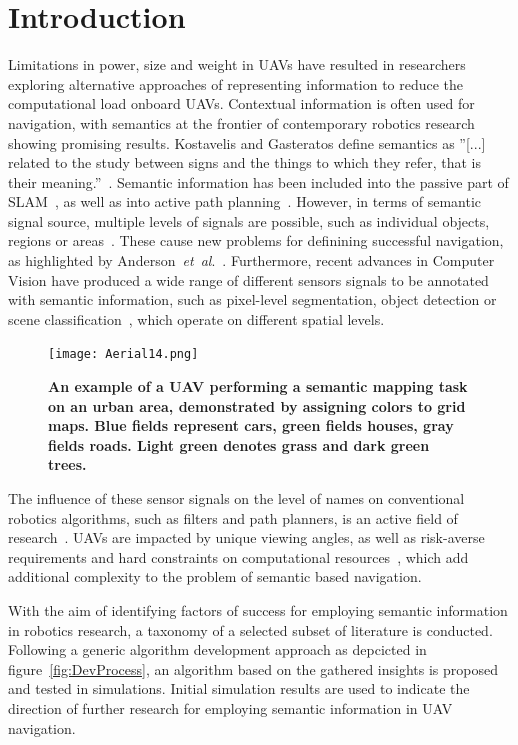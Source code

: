 \documentclass[twocolumn,letterpaper]{IEEEAerospaceCLS}  %
\newcommand{\abbreviation}[1]{\emph{#1}.}
\newcommand{\etal}{\abbreviation{et~al}}
\begin{document}
\section{Introduction} \label{sec:Intro}
Limitations in power, size and weight in UAVs have resulted in researchers exploring alternative approaches of representing information to reduce the computational load onboard UAVs. Contextual information is often used for navigation, with semantics at the frontier of contemporary robotics research showing promising results. Kostavelis and Gasteratos define semantics as ''[...] related to the study between signs and the things to which they refer, that is their meaning.''~\cite{kostavelis_semantic_2015}. Semantic information has been included into the passive part of SLAM~\cite{cadena_past_2016,zhang_hierarchical_2019}, as well as into active path planning~\cite{koch_automatic_2019,alirezaie_exploiting_2017}.  However, in terms of semantic signal source, multiple levels of signals are possible, such as individual objects, regions or areas~\cite{kostavelis_semantic_2015}. These cause new problems for definining successful navigation, as highlighted by Anderson~\etal~\cite{anderson_evaluation_2018}. Furthermore, recent advances in Computer Vision have produced a wide range of different sensors signals to be annotated with semantic information, such as pixel-level segmentation, object detection or scene classification~\cite{alom_history_2018}, which operate on different spatial levels.
\begin{figure}[t]
    \centering
    \texttt{[image: Aerial14.png]}\\
    \caption{\bf{An example of a UAV performing a semantic mapping task on an urban area, demonstrated by assigning colors to grid maps. Blue fields represent cars, green fields houses, gray fields roads. Light green denotes grass and dark green trees.}}
    \label{fig:AerialImg}
\end{figure}
The influence of these sensor signals on the level of names on conventional robotics algorithms, such as filters and path planners, is an active field of research~\cite{kostavelis_semantic_2015,cadena_past_2016,anderson_evaluation_2018}. UAVs are impacted by unique viewing angles, as well as risk-averse requirements and hard constraints on computational resources~\cite{mandel_method_2020,gonzalez_unmanned_2016,boroujerdian_mavbench_2018}, which add additional complexity to the problem of semantic based navigation.

With the aim of identifying factors of success for employing semantic information in robotics research, a taxonomy of a selected subset of literature is conducted. Following a generic algorithm development approach as depcicted in figure~\ref{fig:DevProcess}, an algorithm based on the gathered insights is proposed and tested in simulations. Initial simulation results are used to indicate the direction of further research for employing semantic information in UAV navigation.
\end{document}
